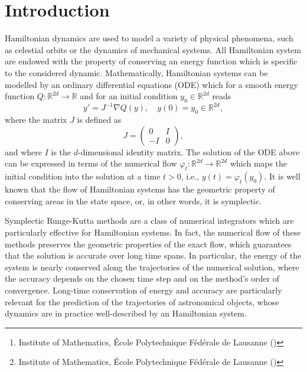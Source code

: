 \documentclass{siamart1116}
\title{{\TheTitle}}
\author{Assyr Abdulle\thanks{Institute of Mathematics, \'Ecole Polytechnique F\'ed\'erale de Lausanne (\email{assyr.abdulle@epfl.ch})}
		\and
		Giacomo Garegnani\thanks{Institute of Mathematics, \'Ecole Polytechnique F\'ed\'erale de Lausanne (\email{giacomo.garegnani@epfl.ch})}}
\numberwithin{theorem}{section}
\renewcommand{\phi}{\varphi}
\newcommand{\R}{\mathbb{R}}
\begin{document}
\maketitle

\begin{abstract} The long-time energy conservation of the random time stepping Runge-Kutta method (RTS-RK) introduced in \cite{AbG18} are studied. Departing from classical backward error analysis tools, we are able to prove via Brouwer's argument \cite{Bro37} that the accumulation of errors due to random perturbations causes an energy drift which grows as the square root of time. Numerical examples confirm our theoretical findings and show the effectiveness of the probabilistic approach in the frame of Bayesian inverse problems.
\end{abstract}

\section{Introduction}

Hamiltonian dynamics are used to model a variety of physical phenomena, such as celestial orbits or the dynamics of mechanical systems. All Hamiltonian system are endowed with the property of conserving an energy function which is specific to the considered dynamic. Mathematically, Hamiltonian systems can be modelled by an ordinary differential equations (ODE) which for a smooth energy function $Q\colon \R^{2d} \to \R$ and for an initial condition $y_0 \in \R^{2d}$ reads
\begin{equation}
y' = J^{-1}\nabla Q(y), \quad y(0) = y_0 \in \R^{2d},
\end{equation}
where the matrix $J$ is defined as
\begin{equation}
J = \begin{pmatrix} 0 & I \\ -I & 0 \end{pmatrix},
\end{equation}
and where $I$ is the $d$-dimensional identity matrix. The solution of the ODE above can be expressed in terms of the numerical flow $\phi_t \colon \R^{2d} \to \R^{2d}$ which maps the initial condition into the solution at a time $t > 0$, i.e., $y(t) = \phi_t(y_0)$. It is well known that the flow of Hamiltonian systems has the geometric property of conserving areas in the state space, or, in other words, it is symplectic. 

Symplectic Runge-Kutta methods are a class of numerical integrators which are particularly effective for Hamiltonian systems. In fact, the numerical flow of these methods preserves the geometric properties of the exact flow, which guarantees that the solution is accurate over long time spans. In particular, the energy of the system is nearly conserved along the trajectories of the numerical solution, where the accuracy depends on the chosen time step and on the method's order of convergence. Long-time conservation of energy and accuracy are particularly relevant for the prediction of the trajectories of astronomical objects, whose dynamics are in practice well-described by an Hamiltonian system.
\end{document}

